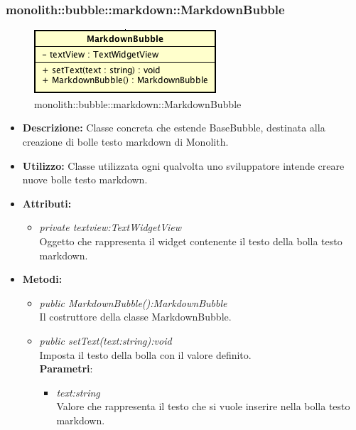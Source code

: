 \subsubsection{monolith::bubble::markdown::MarkdownBubble}

\label{monolith::bubble::markdown::MarkdownBubble}
\begin{figure}[ht]
	\centering
	\includegraphics[scale=0.5]{Sezioni/SottosezioniST/img/MarkdownBubble.png}
	\caption{monolith::bubble::markdown::MarkdownBubble}
\end{figure}

\begin{itemize}
\item \textbf{Descrizione:} Classe concreta che estende BaseBubble, destinata alla creazione di bolle testo markdown di Monolith.
\item \textbf{Utilizzo:} Classe utilizzata ogni qualvolta uno sviluppatore intende creare nuove bolle testo markdown.
\item \textbf{Attributi:}
\begin{itemize}
\item \textit{private textview:TextWidgetView}\\
Oggetto che rappresenta il widget contenente il testo della bolla testo markdown.
\end{itemize}
\item \textbf{Metodi:}
\begin{itemize}
\item \textit{public MarkdownBubble():MarkdownBubble}\\
Il costruttore della classe MarkdownBubble.
\item \textit{public setText(text:string):void}\\
Imposta il testo della bolla con il valore definito.
\\ \textbf{Parametri}: \begin{itemize}
\item \textit{text:string}\\
Valore che rappresenta il testo che si vuole inserire nella bolla testo markdown.
\end{itemize}
\end{itemize}
\end{itemize}

